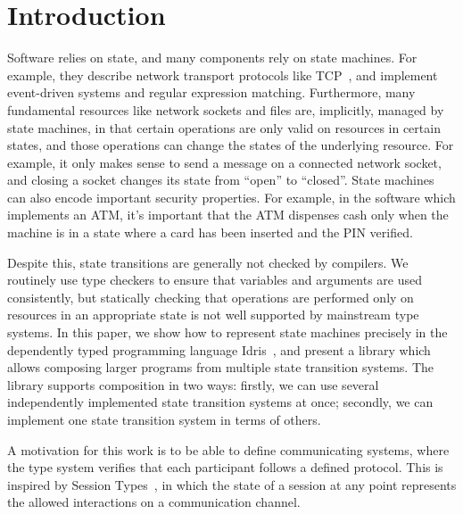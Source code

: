 \section{Introduction}

Software relies on state, and many components rely on state machines. For
example, they describe network transport protocols like TCP~\citep{rfc793}, and
implement event-driven systems and regular expression matching.
%
Furthermore, many fundamental resources like network sockets and
files are, implicitly, managed by state machines, in that certain
operations are only valid on resources in certain states, and those operations
can change the states of the underlying resource.  For example, it only makes
sense to send a message on a connected network socket, and closing a socket
changes its state from ``open'' to ``closed''. State machines can also encode
important security properties. For example, in the software which implements
an ATM, it's important that the ATM dispenses cash only when the machine is
in a state where a card has been inserted and the PIN verified.

Despite this, state transitions are generally not checked by compilers.
We routinely use type checkers to ensure that variables and
arguments are used consistently, but statically checking that
operations are performed only on resources in an appropriate state is not well
supported by mainstream type systems.
%
In this paper, we show how to represent state machines precisely in the
dependently typed programming language Idris~\citep{brady2013idris},
and present a library which allows composing larger programs from multiple
state transition systems. The library supports composition in two ways:
firstly, we can use several independently implemented state transition
systems at once; secondly, we can implement one state transition system
in terms of others.


A motivation for this work is to be able to define communicating
systems, where the type system verifies that each participant follows a 
defined protocol. This is inspired by Session Types~\citep{Honda93,Honda08},
in which the state of a session at any point represents the allowed
interactions on a communication channel. 

